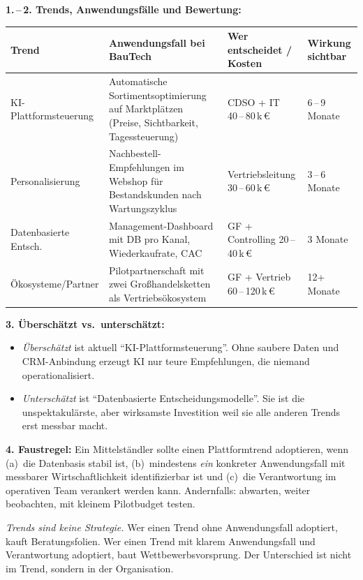 \documentclass[11pt,a4paper,oneside]{article}
\begin{document}
\begin{loesungbox}
\textbf{1.\,--\,2. Trends, Anwendungsfälle und Bewertung:}

\smallskip
\begin{tabularx}{\linewidth}{@{}lXXX@{}}
\toprule
\textbf{Trend} & \textbf{Anwendungsfall bei BauTech} & \textbf{Wer entscheidet / Kosten} & \textbf{Wirkung sichtbar} \\
\midrule
KI-Plattformsteuerung    & Automatische Sortimentsoptimierung auf Marktplätzen (Preise, Sichtbarkeit, Tagessteuerung) & CDSO + IT \textperiodcentered{} 40\,--\,80\,k\,\euro & 6\,--\,9 Monate \\
\midrule
Personalisierung         & Nachbestell-Empfehlungen im Webshop für Bestandskunden nach Wartungszyklus & Vertriebsleitung \textperiodcentered{} 30\,--\,60\,k\,\euro & 3\,--\,6 Monate \\
\midrule
Datenbasierte Entsch.    & Management-Dashboard mit DB pro Kanal, Wiederkaufrate, CAC & GF + Controlling \textperiodcentered{} 20\,--\,40\,k\,\euro & 3 Monate \\
\midrule
Ökosysteme/Partner       & Pilotpartnerschaft mit zwei Großhandelsketten als Vertriebsökosystem & GF + Vertrieb \textperiodcentered{} 60\,--\,120\,k\,\euro & 12+ Monate \\
\bottomrule
\end{tabularx}

\smallskip
\textbf{3. Überschätzt vs.\ unterschätzt:}
\begin{itemize}
  \item \emph{Überschätzt} ist aktuell ``KI-Plattformsteuerung''. Ohne saubere Daten und CRM-Anbindung erzeugt KI nur teure Empfehlungen, die niemand operationalisiert.
  \item \emph{Unterschätzt} ist ``Datenbasierte Entscheidungsmodelle''. Sie ist die unspektakulärste, aber wirksamste Investition \textendash{} weil sie alle anderen Trends erst messbar macht.
\end{itemize}

\textbf{4. Faustregel:}
Ein Mittelständler sollte einen Plattformtrend adoptieren, wenn (a)~die Datenbasis stabil ist, (b)~mindestens \emph{ein} konkreter Anwendungsfall mit messbarer Wirtschaftlichkeit identifizierbar ist und (c)~die Verantwortung im operativen Team verankert werden kann. Andernfalls: abwarten, weiter beobachten, mit kleinem Pilotbudget testen.

\begin{merkbox}[Managementhinweis]
\emph{Trends sind keine Strategie.} Wer einen Trend ohne Anwendungsfall adoptiert, kauft Beratungsfolien. Wer einen Trend mit klarem Anwendungsfall und Verantwortung adoptiert, baut Wettbewerbsvorsprung. Der Unterschied ist nicht im Trend, sondern in der Organisation.
\end{merkbox}
\end{loesungbox}
\end{document}
